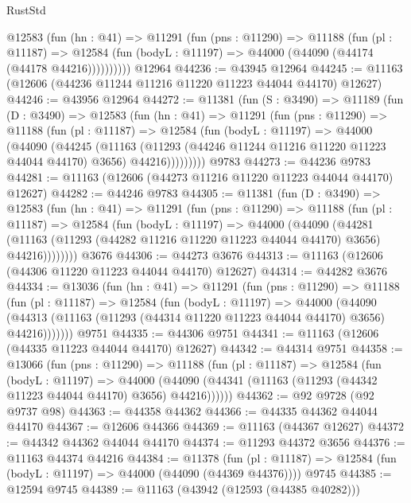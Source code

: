 \begin{lexlean}{RustStd}
\begin{coremodule}
        @12583
          (fun (hn : @41) =>
          @11291
            (fun (pns : @11290) =>
            @11188
              (fun (pl : @11187) =>
              @12584 (fun (bodyL : @11197) => @44000 (@44090 (@44174 (@44178 @44216))))))))))
    @12964
@44236 := @43945 @12964
@44245 := @11163 (@12606 (@44236 @11244 @11216 @11220 @11223 @44044 @44170) @12627)
@44246 := @43956 @12964
@44272 := @11381
    (fun (S : @3490) =>
    @11189
      (fun (D : @3490) =>
      @12583
        (fun (hn : @41) =>
        @11291
          (fun (pns : @11290) =>
          @11188
            (fun (pl : @11187) =>
            @12584
              (fun (bodyL : @11197) =>
              @44000
                (@44090
                  (@44245
                    (@11163
                      (@11293 (@44246 @11244 @11216 @11220 @11223 @44044 @44170) @3656)
                      @44216)))))))))
    @9783
@44273 := @44236 @9783
@44281 := @11163 (@12606 (@44273 @11216 @11220 @11223 @44044 @44170) @12627)
@44282 := @44246 @9783
@44305 := @11381
    (fun (D : @3490) =>
    @12583
      (fun (hn : @41) =>
      @11291
        (fun (pns : @11290) =>
        @11188
          (fun (pl : @11187) =>
          @12584
            (fun (bodyL : @11197) =>
            @44000
              (@44090
                (@44281
                  (@11163 (@11293 (@44282 @11216 @11220 @11223 @44044 @44170) @3656) @44216))))))))
    @3676
@44306 := @44273 @3676
@44313 := @11163 (@12606 (@44306 @11220 @11223 @44044 @44170) @12627)
@44314 := @44282 @3676
@44334 := @13036
    (fun (hn : @41) =>
    @11291
      (fun (pns : @11290) =>
      @11188
        (fun (pl : @11187) =>
        @12584
          (fun (bodyL : @11197) =>
          @44000
            (@44090
              (@44313 (@11163 (@11293 (@44314 @11220 @11223 @44044 @44170) @3656) @44216)))))))
    @9751
@44335 := @44306 @9751
@44341 := @11163 (@12606 (@44335 @11223 @44044 @44170) @12627)
@44342 := @44314 @9751
@44358 := @13066
    (fun (pns : @11290) =>
    @11188
      (fun (pl : @11187) =>
      @12584
        (fun (bodyL : @11197) =>
        @44000 (@44090 (@44341 (@11163 (@11293 (@44342 @11223 @44044 @44170) @3656) @44216))))))
@44362 := @92 @9728 (@92 @9737 @98)
@44363 := @44358 @44362
@44366 := @44335 @44362 @44044 @44170
@44367 := @12606 @44366
@44369 := @11163 (@44367 @12627)
@44372 := @44342 @44362 @44044 @44170
@44374 := @11293 @44372 @3656
@44376 := @11163 @44374 @44216
@44384 := @11378
    (fun (pl : @11187) => @12584 (fun (bodyL : @11197) => @44000 (@44090 (@44369 @44376))))
    @9745
@44385 := @12594 @9745
@44389 := @11163 (@43942 (@12593 (@44385 @40282)))

\end{coremodule}
\end{lexlean}
